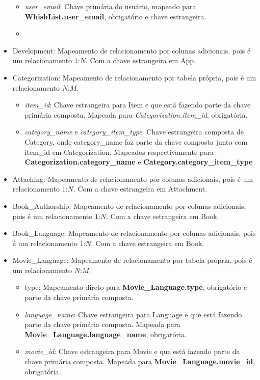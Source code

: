 \documentclass[a4paper, 11pt]{article}
\begin{document}
\begin{itemize}
\begin{itemize}
        \item {\textit{user\_email}}: Chave primária do usuário, mapeado para {\textbf{WhishList.user\_email}}, obrigatório e chave estrangeira.
        \item 
    \end{itemize}
    \item Development: Mapeamento de relacionamento por colunas adicionais, pois é um relacionamento $1$:$N$. Com a chave estrangeira em App.
    \item Categorization: Mapeamento de relacionamento por tabela própria, pois é um relacionamento $N$:$M$.
    \begin{itemize}
        \item {\textit{item\_id}}: Chave estrangeira para Item e que está fazendo parte da chave primária composta. Mapeada para {\textit{Categorization.item\_id}}, obrigatória.
        \item {\textit{category\_name}} e {\textit{category\_item\_type}}: Chave estrangeira composta de Category, onde category\_name faz parte da chave composta junto com item\_id em Categorization. Mapeados respectivamente para {\textbf{Categorization.category\_name}} e {\textbf{Category.category\_item\_type}}
    \end{itemize}
    \item Attaching: Mapeamento de relacionamento por colunas adicionais, pois é um relacionamento $1$:$N$. Com a chave estrangeira em Attachment.
    \item Book\_Authorship: Mapeamento de relacionamento por colunas adicionais, pois é um relacionamento $1$:$N$. Com a chave estrangeira em Book.
    \item Book\_Language: Mapeamento de relacionamento por colunas adicionais, pois é um relacionamento $1$:$N$. Com a chave estrangeira em Book.
    \item Movie\_Language: Mapeamento de relacionamento por tabela própria, pois é um relacionamento $N$:$M$.
    \begin{itemize}
        \item type: Mapeamento direto para {\textbf{Movie\_Language.type}}, obrigatório e parte da chave primária composta.
        \item {\textit{language\_name}}: Chave estrangeira para Language e que está fazendo parte da chave primária composta. Mapeada para {\textbf{Movie\_Language.language\_name}}, obrigatória.
        \item {\textit{movie\_id}}: Chave estrangeira para Movie e que está fazendo parte da chave primária composta. Mapeada para {\textbf{Movie\_Language.movie\_id}}, obrigatória.

\end{itemize}
\end{itemize}
\end{document}
